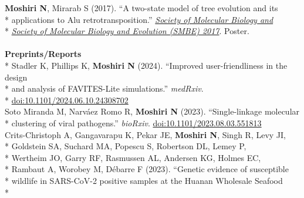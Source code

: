\documentclass[margin,line]{res}
\begin{document}
\begin{resume}
\hspace*{4mm} \textbf{Moshiri N}, Mirarab S (2017). ``A two-state model of tree evolution and its\\*
\hspace*{9.5mm} applications to Alu retrotransposition.'' \href{https://smbe.org/smbe/}{\textit{Society of Molecular Biology and}}\\*\vspace{2mm}
\hspace*{8mm} \href{https://smbe.org/smbe/}{\textit{Society of Molecular Biology and Evolution (SMBE) 2017}}. Poster.\\
~\\
\textbf{Preprints/Reports}\vspace{2mm}\\*
\hspace*{4mm} Stadler K, Phillips K, \textbf{Moshiri N} (2024). ``Improved user-friendliness in the design\\*
\hspace*{9.5mm} and analysis of FAVITES-Lite simulations.'' \textit{medRxiv}.\\*\vspace{2mm}
\hspace*{8mm} \href{https://doi.org/10.1101/2024.06.10.24308702}{doi:10.1101/2024.06.10.24308702}\\
\hspace*{4mm} Soto Miranda M, Narv\'{a}ez Romo R, \textbf{Moshiri N} (2023). ``Single-linkage molecular\\*\vspace{2mm}
\hspace*{8mm} clustering of viral pathogens.'' \textit{bioRxiv}. \href{https://doi.org/10.1101/2023.08.03.551813}{doi:10.1101/2023.08.03.551813}\\
\hspace*{4mm} Crits-Christoph A, Gangavarapu K, Pekar JE, \textbf{Moshiri N}, Singh R, Levy JI,\\*
\hspace*{9.5mm} Goldstein SA, Suchard MA, Popescu S, Robertson DL, Lemey P,\\*
\hspace*{9.5mm} Wertheim JO, Garry RF, Rasmussen AL, Andersen KG, Holmes EC,\\*
\hspace*{9.5mm} Rambaut A, Worobey M, D\'ebarre F (2023). ``Genetic evidence of susceptible\\*
\hspace*{9.5mm} wildlife in SARS-CoV-2 positive samples at the Huanan Wholesale Seafood\\*

\end{resume}
\end{document}
